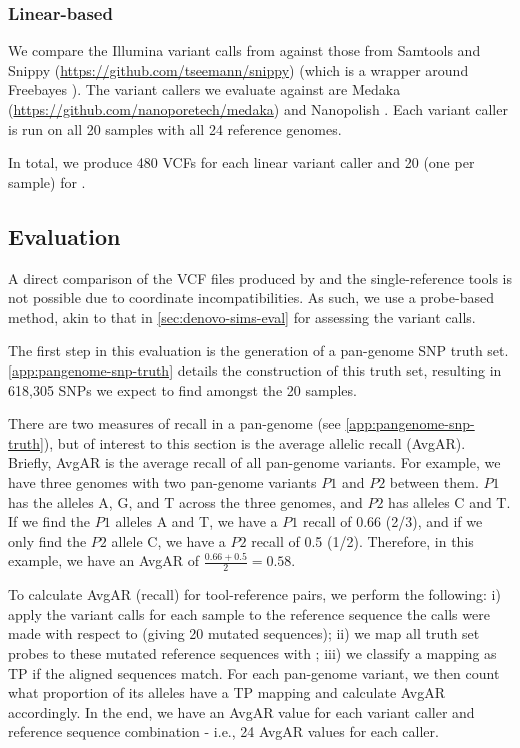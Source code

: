 \subsubsection{Linear-based}
We compare the Illumina variant calls from \pandora{} against those from Samtools \cite{samtools2009} and Snippy (\url{https://github.com/tseemann/snippy}) (which is a wrapper around Freebayes \cite{Garrison2012}). The \ont{} variant callers we evaluate against are Medaka (\url{https://github.com/nanoporetech/medaka}) and Nanopolish \cite{Loman2015}. Each variant caller is run on all 20 samples with all 24 reference genomes. 

\noindent
In total, we produce 480 VCFs for each linear variant caller and 20 (one per sample) for \pandora{}.

\subsection{Evaluation}
\label{sec:denovo-empirical-eval}

A direct comparison of the VCF files produced by \pandora{} and the single-reference tools is not possible due to coordinate incompatibilities. As such, we use a probe-based method, akin to that in \autoref{sec:denovo-sims-eval} for assessing the variant calls. 

The first step in this evaluation is the generation of a pan-genome SNP truth set. \autoref{app:pangenome-snp-truth} details the construction of this truth set, resulting in 618,305 SNPs we expect to find amongst the 20 samples.

There are two measures of recall in a pan-genome (see \autoref{app:pangenome-snp-truth}), but of interest to this section is the average allelic recall (AvgAR). Briefly, AvgAR is the average recall of all pan-genome variants. For example, we have three genomes with two pan-genome variants $P1$ and $P2$ between them. $P1$ has the alleles A, G, and T across the three genomes, and $P2$ has alleles C and T. If we find the $P1$ alleles A and T, we have a $P1$ recall of 0.66 (2/3), and if we only find the $P2$ allele C, we have a $P2$ recall of 0.5 (1/2). Therefore, in this example, we have an AvgAR of $\frac{0.66+0.5}{2}=0.58$.

To calculate AvgAR (recall) for tool-reference pairs, we perform the following: i) apply the variant calls for each sample to the reference sequence the calls were made with respect to (giving 20 mutated sequences); ii) we map all truth set probes to these mutated reference sequences with ; iii) we classify a mapping as TP if the aligned sequences match. For each pan-genome variant, we then count what proportion of its alleles have a TP mapping and calculate AvgAR accordingly. In the end, we have an AvgAR value for each variant caller and reference sequence combination - i.e., 24 AvgAR values for each caller.


